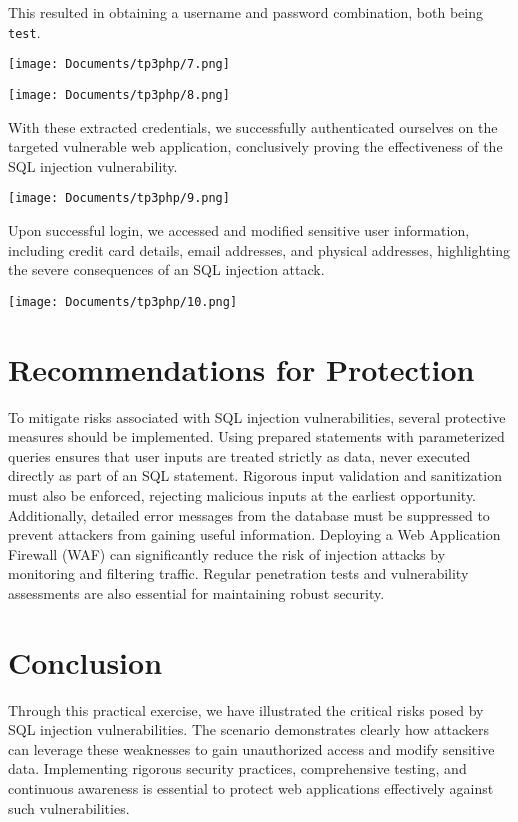 \documentclass{article}
\begin{document}
This resulted in obtaining a username and password combination, both being \texttt{test}.

\texttt{[image: Documents/tp3php/7.png]}

\texttt{[image: Documents/tp3php/8.png]}

With these extracted credentials, we successfully authenticated ourselves on the targeted vulnerable web application, conclusively proving the effectiveness of the SQL injection vulnerability.

\texttt{[image: Documents/tp3php/9.png]}

Upon successful login, we accessed and modified sensitive user information, including credit card details, email addresses, and physical addresses, highlighting the severe consequences of an SQL injection attack.

\texttt{[image: Documents/tp3php/10.png]}

\section{Recommendations for Protection}
To mitigate risks associated with SQL injection vulnerabilities, several protective measures should be implemented. Using prepared statements with parameterized queries ensures that user inputs are treated strictly as data, never executed directly as part of an SQL statement. Rigorous input validation and sanitization must also be enforced, rejecting malicious inputs at the earliest opportunity. Additionally, detailed error messages from the database must be suppressed to prevent attackers from gaining useful information. Deploying a Web Application Firewall (WAF) can significantly reduce the risk of injection attacks by monitoring and filtering traffic. Regular penetration tests and vulnerability assessments are also essential for maintaining robust security.

\section{Conclusion}
Through this practical exercise, we have illustrated the critical risks posed by SQL injection vulnerabilities. The scenario demonstrates clearly how attackers can leverage these weaknesses to gain unauthorized access and modify sensitive data. Implementing rigorous security practices, comprehensive testing, and continuous awareness is essential to protect web applications effectively against such vulnerabilities.
\end{document}

